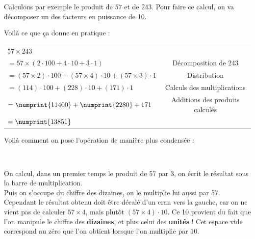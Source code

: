 \documentclass[a4paper]{article}
\begin{document}
Calculons par exemple le produit de $57$ et de $243$. Pour faire ce calcul, on va décomposer un des facteurs en puissance de 10.

\vfill

Voilà ce que ça donne en pratique :

\doublespacing

\begin{tabular}{l|c}

	$ 57 \times 243$

	\tabularnewline

	$= 57 \times (2\cdot100 + 4\cdot10 + 3\cdot1)$ & Décomposition de 243

	\tabularnewline

	$= (57 \times 2)\cdot100 + (57 \times 4)\cdot10 + (57 \times 3)\cdot1 $ & Distribution

	\tabularnewline

	$= (114)\cdot100 + (228)\cdot10 + (171)\cdot1 $ & Calculs des multiplications

	\tabularnewline

	$= \numprint{11400} + \numprint{2280} + 171 $ & Additions des produits calculés

	\tabularnewline

	$= \numprint{13851}$

\end{tabular}

\vfill

\singlespacing

Voilà comment on pose l'opération de manière plus condensée : 
	
	\begin{center}

	 \\
	
	\end{center}
	

\vfill

On calcul, dans un premier temps le produit de 57 par 3, on écrit le résultat sous la barre de multiplication.\\

Puis on s'occupe du chiffre des dizaines, on le multiplie lui aussi par 57. Cependant le résultat obtenu doit être décalé d'un cran vers la gauche, car on ne vient pas de calculer $ 57 \times 4 $, mais plutôt $ (57 \times 4) \cdot 10$. Ce 10 provient du fait que l'on manipule le chiffre des \textbf{dizaines}, et plus celui des \textbf{unités} ! Cet espace vide correspond au zéro que l'on obtient lorsque l'on multiplie par 10.\\
\end{document}
